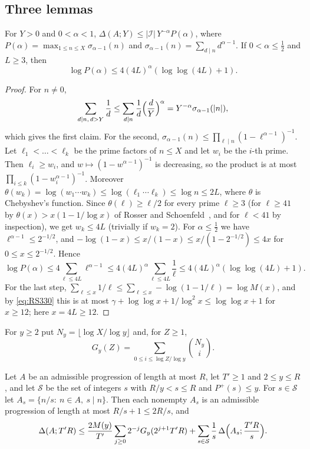 \subsection{Three lemmas}

\begin{lemma}[Rankin]\label{lem:rankin}
For $Y>0$ and $0<\alpha<1$, $\Delta(A;Y)\le|\mathcal I|\,Y^{-\alpha}P(\alpha)$, where $P(\alpha)=\max_{1\le n\le X}\sigma_{\alpha-1}(n)$ and $\sigma_{\alpha-1}(n)=\sum_{d\mid n}d^{\alpha-1}$. If $0<\alpha\le\frac12$ and $L\ge3$, then
\[
\log P(\alpha)\le4(4L)^\alpha(\log\log(4L)+1).
\]
\end{lemma}

\begin{proof}
For $n\ne0$,
\[
\sum_{d\mid n,\,d>Y}\frac1d\le\sum_{d\mid n}\frac1d\Bigl(\frac dY\Bigr)^\alpha=Y^{-\alpha}\sigma_{\alpha-1}(|n|),
\]
which gives the first claim. For the second, $\sigma_{\alpha-1}(n)\le\prod_{\ell\mid n}(1-\ell^{\alpha-1})^{-1}$. Let $\ell_1<\dots<\ell_k$ be the prime factors of $n\le X$ and let $w_i$ be the $i$-th prime. Then $\ell_i\ge w_i$, and $w\mapsto(1-w^{\alpha-1})^{-1}$ is decreasing, so the product is at most $\prod_{i\le k}(1-w_i^{\alpha-1})^{-1}$. Moreover $\theta(w_k)=\log(w_1\cdots w_k)\le\log(\ell_1\cdots\ell_k)\le\log n\le2L$, where $\theta$ is Chebyshev's function. Since $\theta(\ell)\ge\ell/2$ for every prime $\ell\ge3$ (for $\ell\ge41$ by $\theta(x)>x(1-1/\log x)$ of Rosser and Schoenfeld~\cite{b23}, and for $\ell<41$ by inspection), we get $w_k\le4L$ (trivially if $w_k=2$). For $\alpha\le\frac12$ we have $\ell^{\alpha-1}\le2^{-1/2}$, and $-\log(1-x)\le x/(1-x)\le x/(1-2^{-1/2})\le4x$ for $0\le x\le2^{-1/2}$. Hence
\[
\log P(\alpha)\le4\sum_{\ell\le4L}\ell^{\alpha-1}\le4(4L)^\alpha\sum_{\ell\le4L}\frac1\ell\le4(4L)^\alpha(\log\log(4L)+1).
\]
For the last step, $\sum_{\ell\le x}1/\ell\le\sum_{\ell\le x}-\log(1-1/\ell)=\log M(x)$, and by \eqref{eq:RS330} this is at most $\gamma+\log\log x+1/\log^2x\le\log\log x+1$ for $x\ge12$; here $x=4L\ge12$.
\end{proof}

For $y\ge2$ put $N_y=\lfloor\log X/\log y\rfloor$ and, for $Z\ge1$,
\[
G_y(Z)=\sum_{0\le i\le\log Z/\log y}\binom{N_y}{i}.
\]

\begin{lemma}\label{lem:one-step}
Let $A$ be an admissible progression of length at most $R$, let $T'\ge1$ and $2\le y\le R$, and let $\mathcal{S}$ be the set of integers $s$ with $R/y<s\le R$ and $P^+(s)\le y$. For $s\in\mathcal{S}$ let $A_s=\{n/s:\ n\in A,\ s\mid n\}$. Then each nonempty $A_s$ is an admissible progression of length at most $R/s+1\le2R/s$, and
\[
\Delta(A;T'R)\le\frac{2M(y)}{T'}\sum_{j\ge0}2^{-j}G_y(2^{j+1}T'R)+\sum_{s\in\mathcal{S}}\frac1s\,\Delta\Bigl(A_s;\frac{T'R}{s}\Bigr).
\]
\end{lemma}

